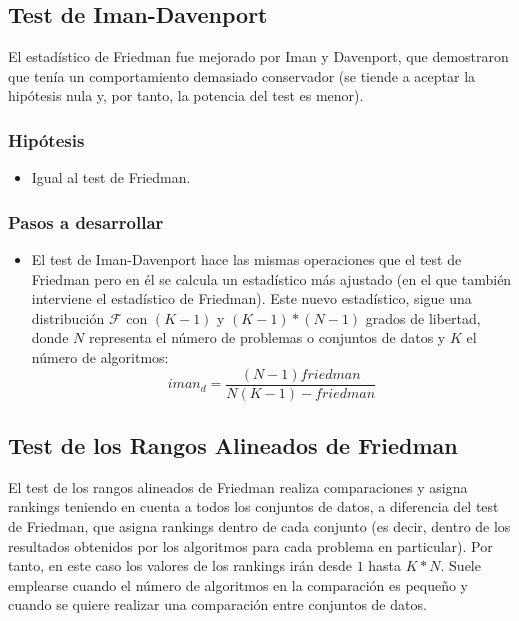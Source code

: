 
\subsection{Test de Iman-Davenport}
El estadístico de Friedman fue mejorado por Iman y Davenport, que demostraron que tenía un comportamiento
demasiado conservador (se tiende a aceptar la hipótesis nula y, por tanto, la potencia del test es menor).

\subsubsection{Hipótesis}
\begin{itemize}
\item Igual al test de Friedman.
\end{itemize}

\subsubsection{Pasos a desarrollar}
\begin{itemize}
\item El test de Iman-Davenport hace las mismas operaciones que el test de Friedman pero en él se calcula
un estadístico más ajustado (en el que también interviene el estadístico de Friedman). Este nuevo estadístico,
sigue una distribución $\mathcal{F}$ con $(K-1)$ y $(K-1)*(N-1)$ grados de libertad, donde $N$
representa el número de problemas o conjuntos de datos y $K$ el número de algoritmos:
\[ iman_d = \frac{(N-1)friedman}{N(K-1)-friedman} \]
\end{itemize}


\subsection{Test de los Rangos Alineados de Friedman}
El test de los rangos alineados de Friedman realiza comparaciones y asigna rankings teniendo en cuenta a
todos los conjuntos de datos, a diferencia del test de Friedman, que asigna rankings dentro de cada conjunto
(es decir, dentro de los resultados obtenidos por los algoritmos para cada problema en particular). Por tanto,
en este caso los valores de los rankings irán desde $1$ hasta $K*N$. Suele emplearse cuando el número de
algoritmos en la comparación es pequeño y cuando se quiere realizar una comparación entre conjuntos de datos.

